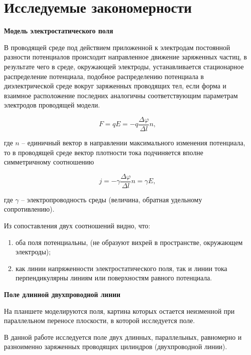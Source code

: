 \section*{Исследуемые закономерности}

\textbf{Модель электростатического поля}

В проводящей среде под
действием приложенной к электродам постоянной разности потенциалов
происходит направленное движение заряженных частиц, в результате чего в
среде, окружающей электроды, устанавливается стационарное распределение
потенциала, подобное распределению потенциала в диэлектрической среде
вокруг заряженных проводящих тел, если форма и взаимное расположение
последних аналогичны соответствующим параметрам электродов
проводящей модели. 



\begin{equation}
	F = qE = -q\dfrac{\varDelta \varphi}{\varDelta l}n,
\end{equation}

где $ n $ -- единичный вектор в направлении максимального изменения
потенциала, то в проводящей среде вектор плотности тока подчиняется
вполне симметричному соотношению 

\begin{equation}
	j = -\gamma\dfrac{\Delta\varphi}{\Delta l}n = \gamma E,
\end{equation} 

где $ \gamma $ -- электропроводность среды (величина, обратная удельному
сопротивлению). 


Из сопоставления двух соотношений видно, что:

\begin{enumerate}
	\item оба поля
	потенциальны, (не образуют вихрей в пространстве, окружающем
	электроды);
	\item как линии напряженности электростатического
	поля, так и линии тока перпендикулярны линиям или поверхностям равного
	потенциала. 
\end{enumerate} 

\textbf{Поле длинной двухпроводной линии}

На планшете моделируются поля,
картина которых остается неизменной при
параллельном переносе плоскости, в
которой исследуется поле. 

В данной работе исследуется поле двух
длинных, параллельных, равномерно и
разноименно заряженных проводящих
цилиндров (двухпроводной линии). 

